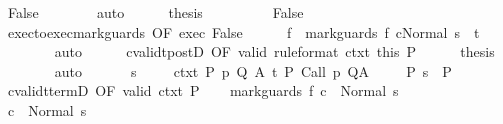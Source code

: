 \begin{isabellebody}
\ False\isanewline
\ \ \ \ \ \ \isamarkupfalse%
\ auto\isanewline
\ \ \ \ \isamarkupfalse%
\ {\isacharquery}thesis\ \isacommand{{\isachardot}{\isachardot}}\isamarkupfalse%
\isanewline
\ \ \isamarkupfalse%
\isanewline
\ \ \ \ \isamarkupfalse%
\ False\isanewline
\ \ \ \ \isamarkupfalse%
\ exec{\isacharunderscore}to{\isacharunderscore}exec{\isacharunderscore}mark{\isacharunderscore}guards\ {\isacharbrackleft}OF\ exec\ False{\isacharbrackright}\isanewline
\ \ \ \ \isamarkupfalse%
\ f{\isacharprime}\ \ {\isachardoublequoteopen}{\isasymGamma}{\isasymturnstile}{\isasymlangle}mark{\isacharunderscore}guards\ f\ c{\isacharcomma}Normal\ s{\isasymrangle}\ {\isasymRightarrow}\ t{\isachardoublequoteclose}\isanewline
\ \ \ \ \ \ \isamarkupfalse%
\ auto\isanewline
\ \ \ \ \isamarkupfalse%
\ cvalidt{\isacharunderscore}postD\ {\isacharbrackleft}OF\ valid\ {\isacharbrackleft}rule{\isacharunderscore}format{\isacharbrackright}\ ctxt\ this\ P{\isacharbrackright}\isanewline
\ \ \ \ \isamarkupfalse%
\ {\isacharquery}thesis\isanewline
\ \ \ \ \ \ \isamarkupfalse%
\ auto\isanewline
\ \ \isamarkupfalse%
\isanewline
{}\isamarkupfalse%
\isanewline
\ \ \isamarkupfalse%
\ s\ \isanewline
\ \ \isamarkupfalse%
\ ctxt{\isacharcolon}\ {\isachardoublequoteopen}{\isasymforall}{\isacharparenleft}P{\isacharcomma}\ p{\isacharcomma}\ Q{\isacharcomma}\ A{\isacharparenright}{\isasymin}{\isasymTheta}{\isachardot}\ {\isasymGamma}{\isasymTurnstile}\isactrlsub t\isactrlbsub {\isacharslash}{\isacharbraceleft}{\isacharbraceright}\isactrlesub \ P\ {\isacharparenleft}Call\ p{\isacharparenright}\ Q{\isacharcomma}A{\isachardoublequoteclose}\ \isanewline
\ \ \isamarkupfalse%
\ P{\isacharcolon}\ {\isachardoublequoteopen}s\ {\isasymin}\ P{\isachardoublequoteclose}\ \isanewline
\ \ \isamarkupfalse%
\ cvalidt{\isacharunderscore}termD\ {\isacharbrackleft}OF\ valid\ ctxt\ P{\isacharbrackright}\isanewline
\ \ \isamarkupfalse%
\ {\isachardoublequoteopen}{\isasymGamma}{\isasymturnstile}mark{\isacharunderscore}guards\ f\ c\ {\isasymdown}\ Normal\ s{\isachardoublequoteclose}\isacommand{{\isachardot}}\isamarkupfalse%
\isanewline
\ \ \isamarkupfalse%
\ {\isachardoublequoteopen}{\isasymGamma}{\isasymturnstile}c\ {\isasymdown}\ Normal\ s{\isachardoublequoteclose}\isanewline
\ \ \ \ \isamarkupfalse%

\end{isabellebody}
